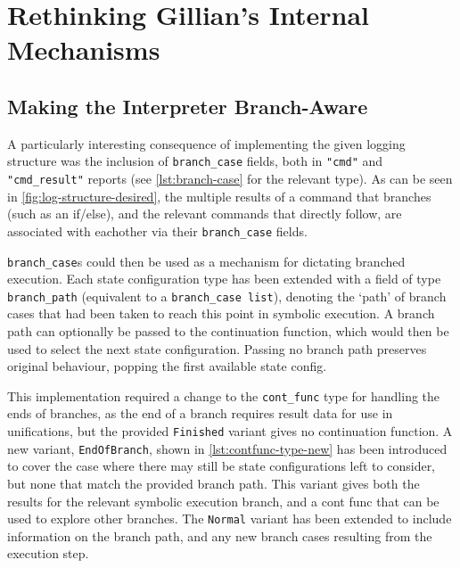 
\section{Rethinking Gillian's Internal Mechanisms}

\subsection{Making the Interpreter Branch-Aware}%
\label{sec:interpreter-branching}

A particularly interesting consequence of implementing the given logging
structure was the inclusion of \texttt{branch\_case} fields, both in
\texttt{"cmd"} and \texttt{"cmd\_result"} reports (see \autoref{lst:branch-case}
for the relevant type). As can be seen in \autoref{fig:log-structure-desired},
the multiple results of a command that branches (such as an if/else), and the
relevant commands that directly follow, are associated with eachother via their
\texttt{branch\_case} fields.

\texttt{branch\_case}s could then be used as a mechanism for dictating branched
execution. Each state configuration type has been extended with a field of type
\texttt{branch\_path} (equivalent to a \texttt{branch\_case list}),  denoting
the `path' of branch cases that had been taken to reach this point in symbolic
execution. A branch path can optionally be passed to the continuation function,
which would then be used to select the next state configuration. Passing no
branch path preserves original behaviour, popping the first available state
config.

This implementation required a change to the \texttt{cont\_func} type for
handling the ends of branches, as the end of a branch requires result data for
use in unifications, but the provided \texttt{Finished} variant gives no
continuation function. A new variant, \texttt{EndOfBranch}, shown in
\autoref{lst:contfunc-type-new} has been introduced to cover the case where
there may still be state configurations left to consider, but none that match
the provided branch path. This variant gives both the results for the relevant
symbolic execution branch, and a cont func that can be used to explore other
branches. The \texttt{Normal} variant has been extended to include information
on the branch path, and any new branch cases resulting from the execution step.

